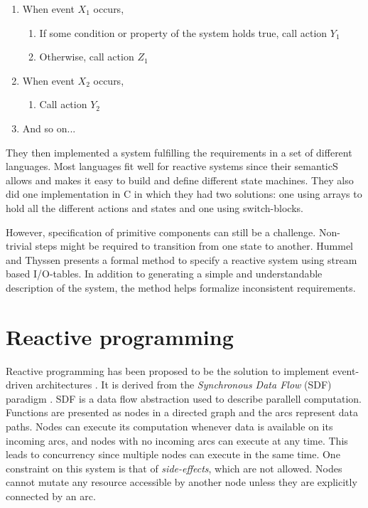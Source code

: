 \begin{enumerate}
\item
  When event $X_1$ occurs,
\begin{enumerate}
\item
  If some condition or property of the system holds true, call action $Y_1$
\item
  Otherwise, call action $Z_1$
\end{enumerate}

\item
  When event $X_2$ occurs,
\begin{enumerate}
\item
  Call action $Y_2$
\end{enumerate}

\item
  And so on...
\end{enumerate}

They then implemented a system fulfilling the requirements in a set of
different languages. Most languages fit well for reactive systems since their
semanticS allows and makes it easy to build and define different state
machines.  They also did one implementation in C in which they had two
solutions: one using arrays to hold all the different actions and states and
one using switch-blocks.

However, specification of primitive components can still be a challenge.
Non-trivial steps might be required to transition from one state to another.
Hummel and Thyssen \cite{hummel2009behavioral} presents a formal method to
specify a reactive system using stream based I/O-tables. In addition to
generating a simple and understandable description of the system, the method
helps formalize inconsistent requirements.

\section{Reactive programming}

Reactive programming has been proposed to be the solution to implement
event-driven architectures \cite{bainomugisha2013survey}. It is derived from
the \textit{Synchronous Data Flow} (SDF) paradigm \cite{lee1987synchronous}.
SDF is a data flow abstraction used to describe parallell computation.
Functions are presented as nodes in a directed graph and the arcs represent
data paths. Nodes can execute its computation whenever data is available on its
incoming arcs, and nodes with no incoming arcs can execute at any time. This
leads to concurrency since multiple nodes can execute in the same time. One
constraint on this system is that of \textit{side-effects}, which are not
allowed. Nodes cannot mutate any resource accessible by another node unless
they are explicitly connected by an arc.

